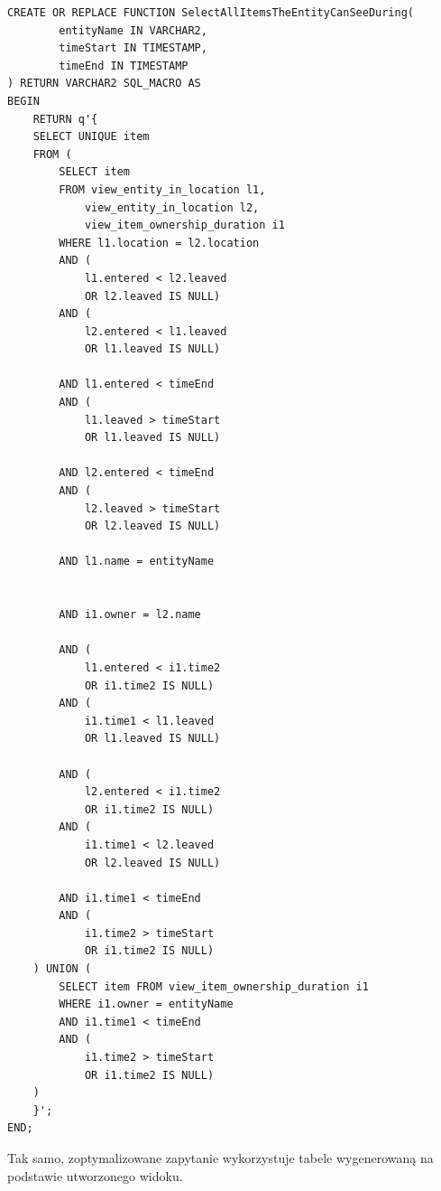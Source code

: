 \documentclass[11pt]{article}
\numberwithin{figure}{subsection}
\begin{document}
		\begin{lstlisting}[caption={Wersja niezoptymalizowana},captionpos=b]
CREATE OR REPLACE FUNCTION SelectAllItemsTheEntityCanSeeDuring(
		entityName IN VARCHAR2,
		timeStart IN TIMESTAMP,
		timeEnd IN TIMESTAMP
) RETURN VARCHAR2 SQL_MACRO AS
BEGIN
	RETURN q'{
	SELECT UNIQUE item
	FROM (
		SELECT item
		FROM view_entity_in_location l1,
			view_entity_in_location l2,
			view_item_ownership_duration i1
		WHERE l1.location = l2.location
		AND (
			l1.entered < l2.leaved
			OR l2.leaved IS NULL)
		AND (
			l2.entered < l1.leaved
			OR l1.leaved IS NULL)
		
		AND l1.entered < timeEnd
		AND (
			l1.leaved > timeStart
			OR l1.leaved IS NULL)
		
		AND l2.entered < timeEnd
		AND (
			l2.leaved > timeStart
			OR l2.leaved IS NULL)
		
		AND l1.name = entityName
		
		
		AND i1.owner = l2.name
		
		AND (
			l1.entered < i1.time2
			OR i1.time2 IS NULL)
		AND (
			i1.time1 < l1.leaved
			OR l1.leaved IS NULL)
		
		AND (
			l2.entered < i1.time2
			OR i1.time2 IS NULL)
		AND (
			i1.time1 < l2.leaved
			OR l2.leaved IS NULL)
		
		AND i1.time1 < timeEnd
		AND (
			i1.time2 > timeStart
			OR i1.time2 IS NULL)
	) UNION (
		SELECT item FROM view_item_ownership_duration i1
		WHERE i1.owner = entityName
		AND i1.time1 < timeEnd
		AND (
			i1.time2 > timeStart
			OR i1.time2 IS NULL)
	)
	}';
END;
		\end{lstlisting}
		
		Tak samo, zoptymalizowane zapytanie wykorzystuje tabele wygenerowaną na
		podstawie utworzonego widoku.
			
\end{document}
